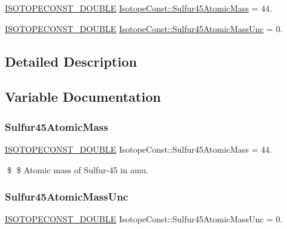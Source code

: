 \begin{DoxyCompactItemize}
\item 
\mbox{\hyperlink{group___isotope_const-_macros_ga8f45a7272ce02c0b4c65c44636ed719a}{I\+S\+O\+T\+O\+P\+E\+C\+O\+N\+S\+T\+\_\+\+D\+O\+U\+B\+LE}} \mbox{\hyperlink{group___isotope_const-_sulfur-_s45_gabe2bfe92eb71130b462feb52517e54bc}{Isotope\+Const\+::\+Sulfur45\+Atomic\+Mass}} = 44.
\item 
\mbox{\hyperlink{group___isotope_const-_macros_ga8f45a7272ce02c0b4c65c44636ed719a}{I\+S\+O\+T\+O\+P\+E\+C\+O\+N\+S\+T\+\_\+\+D\+O\+U\+B\+LE}} \mbox{\hyperlink{group___isotope_const-_sulfur-_s45_ga4ea03dba25af1ad911dbd588ebf1b2e0}{Isotope\+Const\+::\+Sulfur45\+Atomic\+Mass\+Unc}} = 0.
\end{DoxyCompactItemize}


\subsection{Detailed Description}


\subsection{Variable Documentation}
\mbox{\label{group___isotope_const-_sulfur-_s45_gabe2bfe92eb71130b462feb52517e54bc}} 
\subsubsection{\texorpdfstring{Sulfur45\+Atomic\+Mass}{Sulfur45AtomicMass}}
{\footnotesize\ttfamily \mbox{\hyperlink{group___isotope_const-_macros_ga8f45a7272ce02c0b4c65c44636ed719a}{I\+S\+O\+T\+O\+P\+E\+C\+O\+N\+S\+T\+\_\+\+D\+O\+U\+B\+LE}} Isotope\+Const\+::\+Sulfur45\+Atomic\+Mass = 44.}

\$ \$ Atomic mass of Sulfur-\/45 in amu. \mbox{\label{group___isotope_const-_sulfur-_s45_ga4ea03dba25af1ad911dbd588ebf1b2e0}} 
\subsubsection{\texorpdfstring{Sulfur45\+Atomic\+Mass\+Unc}{Sulfur45AtomicMassUnc}}
{\footnotesize\ttfamily \mbox{\hyperlink{group___isotope_const-_macros_ga8f45a7272ce02c0b4c65c44636ed719a}{I\+S\+O\+T\+O\+P\+E\+C\+O\+N\+S\+T\+\_\+\+D\+O\+U\+B\+LE}} Isotope\+Const\+::\+Sulfur45\+Atomic\+Mass\+Unc = 0.}

